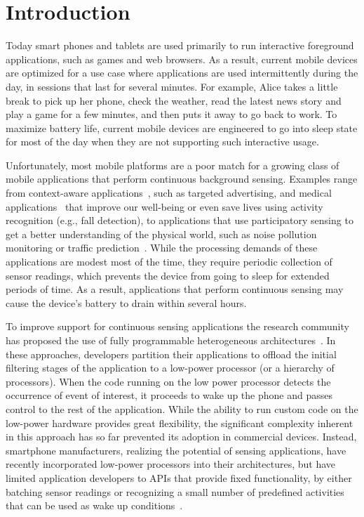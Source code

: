 
\section{\label{sec:Introduction}Introduction}

Today smart phones and tablets are used primarily to run interactive
foreground applications, such as games and web browsers.  As a result,
current mobile devices are optimized for a use case where applications
are used intermittently during the day, in sessions that last for
several minutes.  For example, Alice takes a little break to pick up
her phone, check the weather, read the latest news story and play a
game for a few minutes, and then puts it away to go back to work.  To
maximize battery life, current mobile devices are engineered to go
into sleep state for most of the day when they are not supporting
such interactive usage.

Unfortunately, most mobile platforms are a poor match for a growing
class of mobile applications that perform continuous background
sensing.  Examples range from context-aware applications~\cite{baldauf2007survey,hong2009context}, such as
targeted advertising, and medical applications~\cite{preuveneers2008mobile,tsai2007usability,hameed2003application} that improve our
well-being or even save lives using activity recognition (e.g., fall
detection), to applications that use participatory sensing to get a
better understanding of the physical world, such as noise pollution~\cite{maisonneuve2009citizen,maisonneuve2009noisetube}
monitoring or traffic prediction~\cite{hull2006cartel}.  While the processing demands of
these applications are modest most of the time, they require periodic
collection of sensor readings, which prevents the device from going to
sleep for extended periods of time.  As a result, applications that
perform continuous sensing may cause the device's battery to drain
within several hours.

To improve support for continuous sensing applications the research
community has proposed the use of fully programmable heterogeneous
architectures~\cite{reflex,turducken}.  In these approaches, developers
partition their applications to offload the initial filtering stages
of the application to a low-power processor (or a hierarchy of
processors).  When the code running on the low power processor detects
the occurrence of event of interest, it proceeds to wake up the phone
and passes control to the rest of the application.  While the ability
to run custom code on the low-power hardware provides great
flexibility, the significant complexity inherent in this approach has
so far prevented its adoption in commercial devices.  Instead,
smartphone manufacturers, realizing the potential of sensing
applications, have recently incorporated low-power processors into
their architectures, but have limited application developers to APIs
that provide fixed functionality, by either batching sensor readings
or recognizing a small number of predefined activities that can be
used as wake up conditions~\cite{android4.4,motox,nexus5}.

